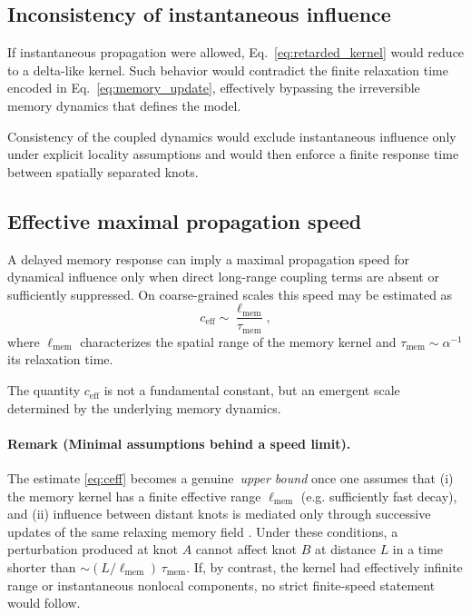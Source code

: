 \documentclass[reprint,amsmath,amssymb,aps,prl,nofootinbib,floatfix]{revtex4-2}
\begin{document}
\subsection{Inconsistency of instantaneous influence}

If instantaneous propagation were allowed, Eq.~\eqref{eq:retarded_kernel} would reduce to a delta-like kernel.
Such behavior would contradict the finite relaxation time encoded in Eq.~\eqref{eq:memory_update}, effectively bypassing the irreversible memory dynamics that defines the model.

Consistency of the coupled dynamics would exclude instantaneous influence only under explicit locality assumptions and would then enforce a finite response time between spatially separated knots.

\subsection{Effective maximal propagation speed}
A delayed memory response can imply a maximal propagation speed for dynamical influence only when direct long-range coupling terms are absent or sufficiently suppressed.
On coarse-grained scales this speed may be estimated as
\begin{equation}
c_{\mathrm{eff}}
\sim \frac{\ell_{\mathrm{mem}}}{\tau_{\mathrm{mem}}},
\label{eq:ceff}
\end{equation}
where $\ell_{\mathrm{mem}}$ characterizes the spatial range of the memory kernel and $\tau_{\mathrm{mem}}\sim\alpha^{-1}$ its relaxation time.

The quantity $c_{\mathrm{eff}}$ is not a fundamental constant, but an emergent scale determined by the underlying memory dynamics.

\paragraph{Remark (Minimal assumptions behind a speed limit).}
The estimate \eqref{eq:ceff} becomes a genuine \,\emph{upper bound} once one assumes that (i) the memory kernel has a finite effective range $\ell_{\mathrm{mem}}$ (e.g. sufficiently fast decay), and (ii) influence between distant knots is mediated only through successive updates of the same relaxing memory field \cite{LiebRobinson1972}.
Under these conditions, a perturbation produced at knot $A$ cannot affect knot $B$ at distance $L$ in a time shorter than $\sim (L/\ell_{\mathrm{mem}})\,\tau_{\mathrm{mem}}$.
If, by contrast, the kernel had effectively infinite range or instantaneous nonlocal components, no strict finite-speed statement would follow.
\end{document}

